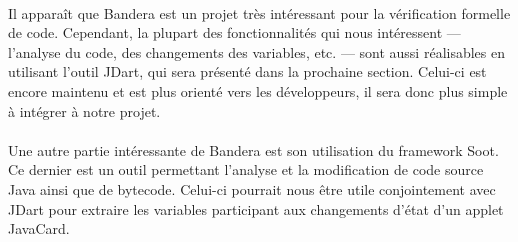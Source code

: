 \paragraph{}
Il apparaît que Bandera est un projet très intéressant pour la
vérification formelle de code. Cependant, la plupart des
fonctionnalités qui nous intéressent --- l'analyse du code, des
changements des variables, etc. --- sont aussi réalisables en
utilisant l'outil JDart, qui sera présenté dans la prochaine
section. Celui-ci est encore maintenu et est plus orienté vers les
développeurs, il sera donc plus simple à intégrer à notre projet.

\paragraph{}
Une autre partie intéressante de Bandera est son utilisation du
framework Soot. Ce dernier est un outil permettant l'analyse et la
modification de code source Java ainsi que de bytecode. Celui-ci
pourrait nous être utile conjointement avec JDart pour extraire les
variables participant aux changements d'état d'un applet JavaCard.
